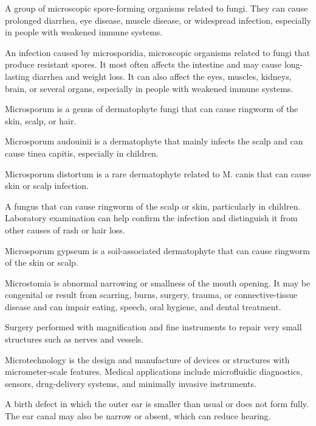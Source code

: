  A group of microscopic spore-forming organisms related to fungi. They can cause prolonged diarrhea, eye disease, muscle disease, or widespread infection, especially in people with weakened immune systems.

 An infection caused by microsporidia, microscopic organisms related to fungi that produce resistant spores. It most often affects the intestine and may cause long-lasting diarrhea and weight loss. It can also affect the eyes, muscles, kidneys, brain, or several organs, especially in people with weakened immune systems.

 Microsporum is a genus of dermatophyte fungi that can cause ringworm of the skin, scalp, or hair.

 Microsporum audouinii is a dermatophyte that mainly infects the scalp and can cause tinea capitis, especially in children.

 Microsporum distortum is a rare dermatophyte related to M. canis that can cause skin or scalp infection.

 A fungus that can cause ringworm of the scalp or skin, particularly in children. Laboratory examination can help confirm the infection and distinguish it from other causes of rash or hair loss.

 Microsporum gypseum is a soil-associated dermatophyte that can cause ringworm of the skin or scalp.

 Microstomia is abnormal narrowing or smallness of the mouth opening. It may be congenital or result from scarring, burns, surgery, trauma, or connective-tissue disease and can impair eating, speech, oral hygiene, and dental treatment.

 Surgery performed with magnification and fine instruments to repair very small structures such as nerves and vessels.

 Microtechnology is the design and manufacture of devices or structures with micrometer-scale features. Medical applications include microfluidic diagnostics, sensors, drug-delivery systems, and minimally invasive instruments.

 A birth defect in which the outer ear is smaller than usual or
does not form fully. The ear canal may also be narrow or absent, which can reduce hearing.

